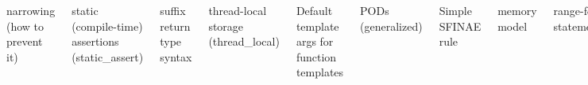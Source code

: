 \begin{frame}[fragile]
\begin{columns}[t]
{narrowing (how to prevent it)

static (compile-time) assertions (static\_assert)

suffix return type syntax

thread-local storage (thread\_local)

Default template args for function templates

}

{\scriptsize
PODs (generalized)

Simple SFINAE rule

memory model

range-for statement

raw string literals

right-angle brackets

template alias

unicode characters

unions (generalized)

user-defined literals

variadic templates

\vskip 12pt

library: smart pointers

}
\end{columns}

\end{frame}
